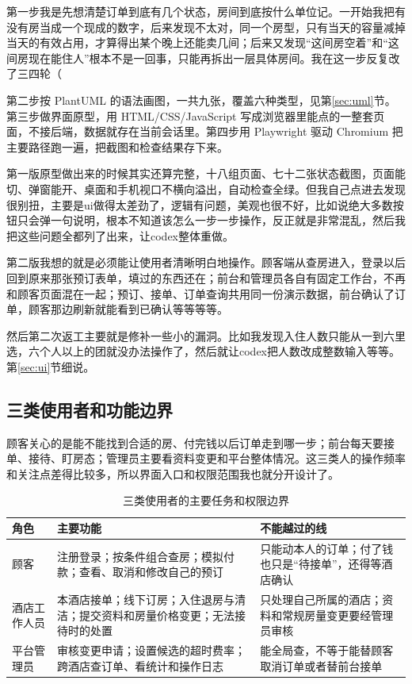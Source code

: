 \documentclass[UTF8,a4paper,zihao=-4,fontset=none]{ctexart}
\begin{document}
第一步我是先想清楚订单到底有几个状态，房间到底按什么单位记。一开始我把有没有房当成一个现成的数字，后来发现不太对，同一个房型，只有当天的容量减掉当天的有效占用，才算得出某个晚上还能卖几间；后来又发现“这间房空着”和“这间房现在能住人”根本不是一回事，只能再拆出一层具体房间。我在这一步反复改了三四轮（

第二步按 PlantUML 的语法画图，一共九张，覆盖六种类型，见第\ref{sec:uml}节。第三步做界面原型，用 HTML/CSS/JavaScript 写成浏览器里能点的一整套页面，不接后端，数据就存在当前会话里。第四步用 Playwright 驱动 Chromium 把主要路径跑一遍，把截图和检查结果存下来。

第一版原型做出来的时候其实还算完整，十八组页面、七十二张状态截图，页面能切、弹窗能开、桌面和手机视口不横向溢出，自动检查全绿。但我自己点进去发现很别扭，主要是ui做得太差劲了，逻辑有问题，美观也很不好，比如说绝大多数按钮只会弹一句说明，根本不知道该怎么一步一步操作，反正就是非常混乱，然后我把这些问题全都列了出来，让codex整体重做。

第二版我想的就是必须能让使用者清晰明白地操作。顾客端从查房进入，登录以后回到原来那张预订表单，填过的东西还在；前台和管理员各自有固定工作台，不再和顾客页面混在一起；预订、接单、订单查询共用同一份演示数据，前台确认了订单，顾客那边刷新就能看到已确认等等等等。

然后第二次返工主要就是修补一些小的漏洞。比如我发现入住人数只能从一到六里选，六个人以上的团就没办法操作了，然后就让codex把人数改成整数输入等等。第\ref{sec:ui}节细说。

\subsection{三类使用者和功能边界}
顾客关心的是能不能找到合适的房、付完钱以后订单走到哪一步；前台每天要接单、接待、盯房态；管理员主要看资料变更和平台整体情况。这三类人的操作频率和关注点差得比较多，所以界面入口和权限范围我也就分开设计了。

\begin{table}[H]\centering\small
\caption{三类使用者的主要任务和权限边界}
\begin{tabularx}{\linewidth}{p{19mm}YY}\toprule
角色&主要功能&不能越过的线\\\midrule
顾客&注册登录；按条件组合查房；模拟付款；查看、取消和修改自己的预订&只能动本人的订单；付了钱也只是“待接单”，还得等酒店确认\\
酒店工作人员&本酒店接单；线下订房；入住退房与清洁；提交资料和房量价格变更；无法接待时的处置&只处理自己所属的酒店；资料和常规房量变更要经管理员审核\\
平台管理员&审核变更申请；设置候选的超时费率；跨酒店查订单、看统计和操作日志&能全局查，不等于能替顾客取消订单或者替前台接单\\\bottomrule
\end{tabularx}\end{table}
\end{document}
